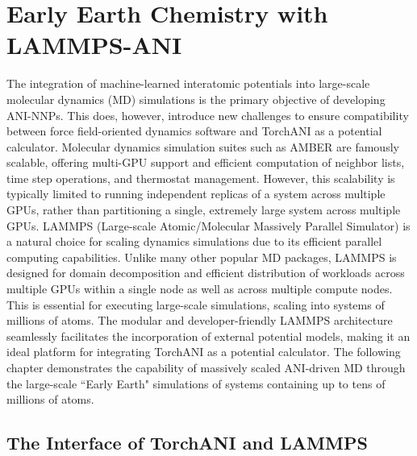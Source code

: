 \chapter{Early Earth Chemistry with LAMMPS-ANI} 
\label{chapter4}

The integration of machine-learned interatomic potentials into large-scale molecular dynamics (MD) simulations is the primary objective of developing ANI-NNPs.
This does, however, introduce new challenges to ensure compatibility between force field-oriented dynamics software and TorchANI as a potential calculator.
Molecular dynamics simulation suites such as AMBER \cite{amber_overview} are famously scalable, offering multi-GPU support and efficient computation of neighbor lists, time step operations, and thermostat management.
However, this scalability is typically limited to running independent replicas of a system across multiple GPUs, rather than partitioning a single, extremely large system across multiple GPUs.
LAMMPS (Large-scale Atomic/Molecular Massively Parallel Simulator) \cite{lammps} is a natural choice for scaling dynamics simulations due to its efficient parallel computing capabilities. 
Unlike many other popular MD packages, LAMMPS is designed for domain decomposition \cite{lammps_original} and efficient distribution of workloads across multiple GPUs within a single node as well as across multiple compute nodes. 
This is essential for executing large-scale simulations, scaling into systems of millions of atoms. 
The modular and developer-friendly LAMMPS architecture seamlessly facilitates the incorporation of external potential models, making it an ideal platform for integrating TorchANI as a potential calculator.
The following chapter demonstrates the capability of massively scaled ANI-driven MD through the large-scale ``Early Earth" simulations of systems containing up to tens of millions of atoms.


\section{The Interface of TorchANI and LAMMPS}
\label{sec:lammps-ani}

